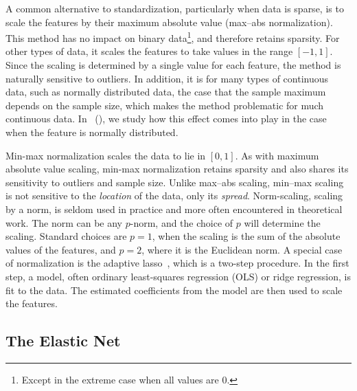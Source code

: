 A common alternative to standardization, particularly when data is sparse, is to scale the
features by their maximum absolute value (max--abs normalization). This method has no
impact on binary data\footnote{Except in the extreme case when all values are 0.}, and
therefore retains sparsity. For other types of data, it scales the features to take values
in the range \([-1, 1]\). Since the scaling is determined by a single value for each
feature, the method is naturally sensitive to outliers. In addition, it is for many types
of continuous data, such as normally distributed data, the case that the sample maximum
depends on the sample size, which makes the method problematic for much continuous data. In
~(), we study how this effect comes into
play in the case when the feature is normally distributed.

Min-max normalization scales the data to lie in \([0, 1]\). As with maximum absolute value
scaling, min-max normalization retains sparsity and also shares its sensitivity to outliers
and sample size. Unlike max--abs scaling, min--max scaling is not sensitive to the
\emph{location} of the data, only its \emph{spread}. Norm-scaling, scaling by a norm, is
seldom used in practice and more often encountered in theoretical work. The norm can be any
\(p\)-norm, and the choice of \(p\) will determine the scaling. Standard choices are
\(p=1\), when the scaling is the sum of the absolute values of the features, and \(p=2\),
where it is the Euclidean norm. A special case of normalization is the adaptive
lasso~\citep{zou2006}, which is a two-step procedure. In the first step, a model, often
ordinary least-squares regression (OLS) or ridge regression, is fit to the data. The
estimated coefficients from the model are then used to scale the features.

\subsection{The Elastic Net}

